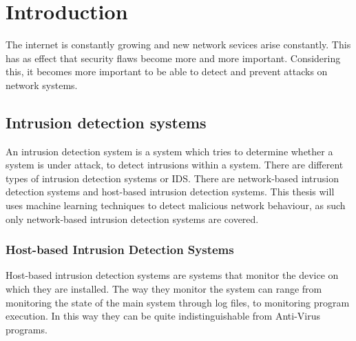 
\chapter{Introduction} %

\label{Chapter1} %

The internet is constantly growing and new network sevices arise constantly. This has as effect that security flaws become more and more important. Considering this, it becomes more important to be able to detect and prevent attacks on network systems.

\section{Intrusion detection systems}
An intrusion detection system is a system which tries to determine whether a system is under attack, to detect intrusions within a system. There are different types of intrusion detection systems or IDS. There are network-based intrusion detection systems and host-based intrusion detection systems. This thesis will uses machine learning techniques to detect malicious network behaviour, as such only network-based intrusion detection systems are covered.

\subsection{Host-based Intrusion Detection Systems}
Host-based intrusion detection systems are systems that monitor the device on which they are installed. The way they monitor the system can range from monitoring the state of the main system through log files, to monitoring program execution. In this way they can be quite indistinguishable from Anti-Virus programs.

